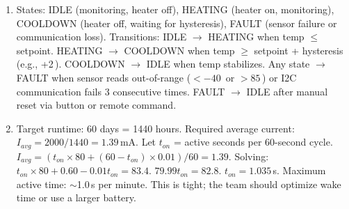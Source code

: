 \begin{enumerate}[leftmargin=1.5em]
\item States: IDLE (monitoring, heater off), HEATING (heater on, monitoring), COOLDOWN (heater off, waiting for hysteresis), FAULT (sensor failure or communication loss). Transitions: IDLE $\to$ HEATING when temp $\leq$ setpoint. HEATING $\to$ COOLDOWN when temp $\geq$ setpoint + hysteresis (e.g., +2\,\degC{}). COOLDOWN $\to$ IDLE when temp stabilizes. Any state $\to$ FAULT when sensor reads out-of-range ($<-40$\,\degC{} or $>85$\,\degC{}) or I2C communication fails 3 consecutive times. FAULT $\to$ IDLE after manual reset via button or remote command.
\item Target runtime: 60 days = 1440 hours. Required average current: $I_{avg} = 2000/1440 = 1.39$\,mA. Let $t_{on}$ = active seconds per 60-second cycle. $I_{avg} = (t_{on} \times 80 + (60 - t_{on}) \times 0.01)/60 = 1.39$. Solving: $t_{on} \times 80 + 0.60 - 0.01 t_{on} = 83.4$. $79.99 t_{on} = 82.8$. $t_{on} = 1.035$\,s. Maximum active time: $\sim$1.0\,s per minute. This is tight; the team should optimize wake time or use a larger battery.
\end{enumerate}



